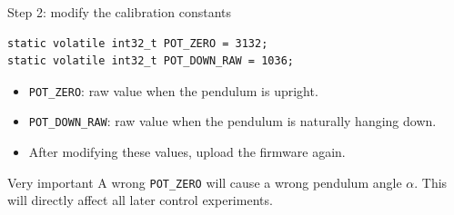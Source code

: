 \documentclass[aspectratio=169]{beamer}
\begin{document}
\begin{frame}[fragile]{Step 2: modify the calibration constants}

\begin{lstlisting}[basicstyle=\ttfamily\small]
static volatile int32_t POT_ZERO = 3132;
static volatile int32_t POT_DOWN_RAW = 1036;
\end{lstlisting}

\vspace{0.3cm}

\begin{itemize}
    \item \texttt{POT\_ZERO}: raw value when the pendulum is upright.
    \vspace{0.25cm}

    \item \texttt{POT\_DOWN\_RAW}: raw value when the pendulum is naturally hanging down.
    \vspace{0.25cm}

    \item After modifying these values, upload the firmware again.
\end{itemize}

\vspace{0.2cm}

\begin{alertblock}{Very important}
\small
A wrong \texttt{POT\_ZERO} will cause a wrong pendulum angle $\alpha$.
This will directly affect all later control experiments.
\end{alertblock}

\end{frame}
\end{document}
